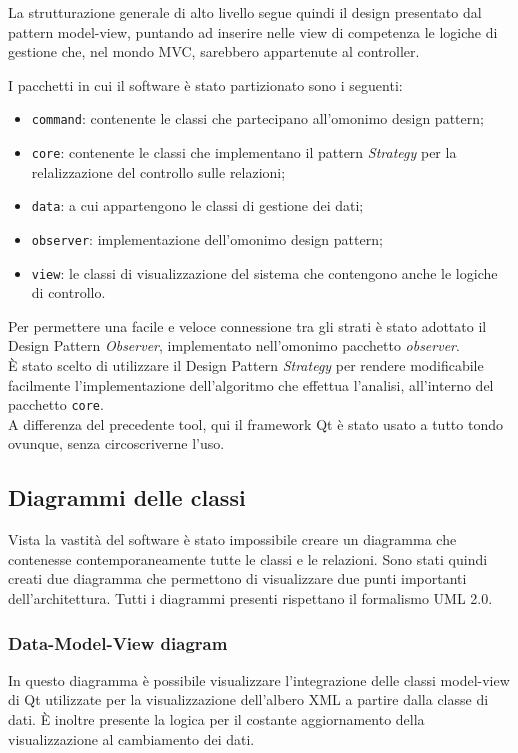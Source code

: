 	La strutturazione generale di alto livello segue quindi il design presentato dal pattern model-view, puntando ad inserire nelle view di competenza le logiche di gestione che, nel mondo MVC, sarebbero appartenute al controller.
	
	I pacchetti in cui il software è stato partizionato sono i seguenti: 
	\begin{itemize}
		\item \texttt{command}: contenente le classi che partecipano all'omonimo design pattern;
		\item\texttt{core}: contenente le classi che implementano il pattern \textit{Strategy} per la relalizzazione del controllo sulle relazioni;
		\item\texttt{data}: a cui appartengono le classi di gestione dei dati;
		\item\texttt{observer}: implementazione dell'omonimo design pattern;
		\item\texttt{view}: le classi di visualizzazione del sistema che contengono anche le logiche di controllo.
	\end{itemize}
	
	Per permettere una facile e veloce connessione tra gli strati è stato adottato il Design Pattern \textit{Observer}, implementato nell'omonimo pacchetto \textit{observer}.\\
	
	È stato scelto di utilizzare il Design Pattern \textit{Strategy} per rendere modificabile facilmente l'implementazione dell'algoritmo che effettua l'analisi, all'interno del pacchetto \texttt{core}.\\
	
	A differenza del precedente tool, qui il framework Qt è stato usato a tutto tondo ovunque, senza circoscriverne l'uso.

	\subsection{Diagrammi delle classi}
		Vista la vastità del software è stato impossibile creare un diagramma che contenesse contemporaneamente tutte le classi e le relazioni. Sono stati quindi creati due diagramma che permettono di visualizzare due punti importanti dell'architettura. Tutti i diagrammi presenti rispettano il formalismo UML 2.0.
		
		\subsubsection{Data-Model-View diagram}
			In questo diagramma è possibile visualizzare l'integrazione delle classi model-view di Qt utilizzate per la visualizzazione dell'albero XML a partire dalla classe di dati. È inoltre presente la logica per il costante aggiornamento della visualizzazione al cambiamento dei dati.
		
